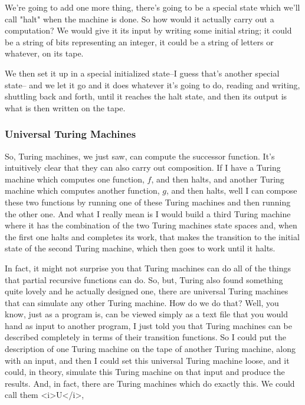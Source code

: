 \documentclass[]{article}
\begin{document}
We're going to add one more thing, there's going to be a special state which we'll call "halt" when the machine is done. So how would it actually carry out a computation?
We would give it its input by writing some initial string; it could be a string of bits
representing an integer, it could be a string of letters or whatever, on its tape.

We then set it up in a special initialized state--I guess that's another special state--
and we let it go and it does whatever it's going to do, reading and writing, shuttling back and forth, until it reaches the halt state, and then its output is what is then written on the tape.



\subsubsection{Universal Turing Machines}

So, Turing machines, we just saw, can compute the successor function.
It's intuitively clear that they can also carry out composition.
If I have a Turing machine which computes
one function, $f$, and then halts, and another Turing machine which computes another function, $g$, and then halts, well I can compose these two functions by running one of these Turing machines and then running the other one.
And what I really mean is I would build a third Turing machine
where it has the combination of the two Turing machines state spaces and, when the first one halts and completes its work, that makes the transition to the initial state
of the second Turing machine, which then goes to work until it halts.

In fact, it might not surprise you
that Turing machines can do
all of the things
that partial recursive functions can do.
So, but,
Turing also found something quite lovely
and he actually designed one,
there are universal Turing machines
that can simulate any other
Turing machine.
How do we do that?
Well, you know, just as a program is,
can be viewed
simply as a text file
that you would hand as input
to another program,
I just told you that Turing machines
can be described completely
in terms of their transition functions.
So I could put
the description of one Turing machine
on the tape
of another Turing machine,
along with an input,
and then I could set this
universal Turing machine loose,
and it could, in theory,
simulate this Turing machine
on that input
and produce the results.
And, in fact,
there are Turing machines
which do exactly this.
We could call them <i>U</i>,
\end{document}
